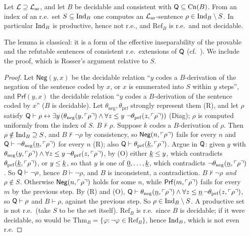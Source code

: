 \begin{lemma}\label{lem:soi:productive}
Let $\mathcal L\supseteq\mathcal{L}_{\mathrm{ar}}$, and let $B$ be decidable and consistent with $\mathsf{Q}\subseteq\mathrm{Cn}(B)$. From an index of an r.e.\ set $S\subseteq\mathrm{Ind}_{B}$ one computes an $\mathcal{L}_{\mathrm{ar}}$-sentence $\rho\in\mathrm{Ind}_{B}\setminus S$. In particular $\mathrm{Ind}_{B}$ is productive, hence not r.e., and $\mathrm{Ref}_B$ is r.e.\ and not decidable.
\end{lemma}

The lemma is classical: it is a form of the effective inseparability of the provable and the refutable sentences of consistent r.e.\ extensions of $\mathsf{Q}$ (cf.\ \citealp{smullyan1961theory}). We include the proof, which is Rosser's argument relative to $S$.

\begin{proof}
Let $\mathsf{Neg}(y,x)$ be the decidable relation ``$y$ codes a $B$-derivation of the negation of the sentence coded by $x$, or $x$ is enumerated into $S$ within $y$ steps'', and $\mathsf{Prf}(y,x)$ the decidable relation ``$y$ codes a $B$-derivation of the sentence coded by $x$'' ($B$ is decidable). Let $\theta_{\mathrm{neg}},\theta_{\mathrm{prf}}$ strongly represent them (R), and let $\rho$ satisfy $\Q\vdash\rho\leftrightarrow\exists y\,(\theta_{\mathrm{neg}}(y,\gn\rho)\wedge\forall z\le y\ \neg\theta_{\mathrm{prf}}(z,\gn\rho))$ (Diag); $\rho$ is computed uniformly from the index of $S$.
\emph{$B\nvdash\rho$.} Suppose $k$ codes a $B$-derivation of $\rho$. Then $\rho\notin\mathrm{Ind}_{B}\supseteq S$, and $B\nvdash\neg\rho$ by consistency, so $\mathsf{Neg}(n,\ulcorner \rho\urcorner)$ fails for every $n$ and $\mathsf{Q}\vdash\neg\theta_{\mathrm{neg}}(\underline{n},\ulcorner \rho\urcorner)$ for every $n$ (R); also $\mathsf{Q}\vdash\theta_{\mathrm{prf}}(\underline{k},\ulcorner \rho\urcorner)$. Argue in $\mathsf{Q}$: given $y$ with $\theta_{\mathrm{neg}}(y,\ulcorner \rho\urcorner)\wedge\forall z\le y\,\neg\theta_{\mathrm{prf}}(z,\ulcorner \rho\urcorner)$, by (O) either $\underline{k}\le y$, which contradicts $\theta_{\mathrm{prf}}(\underline{k},\ulcorner \rho\urcorner)$, or $y\le\underline{k}$, so that $y$ is one of $\underline{0},\dots,\underline{k}$, which contradicts $\neg\theta_{\mathrm{neg}}(\underline{n},\ulcorner \rho\urcorner)$. So $\mathsf{Q}\vdash\neg\rho$, hence $B\vdash\neg\rho$, and $B$ is inconsistent, a contradiction.
\emph{$B\nvdash\neg\rho$ and $\rho\notin S$.} Otherwise $\mathsf{Neg}(n,\ulcorner \rho\urcorner)$ holds for some $n$, while $\mathsf{Prf}(m,\ulcorner \rho\urcorner)$ fails for every $m$ by the previous step. By (R) and (O), $\mathsf{Q}\vdash\theta_{\mathrm{neg}}(\underline{n},\ulcorner \rho\urcorner)\wedge\forall z\le\underline{n}\,\neg\theta_{\mathrm{prf}}(z,\ulcorner \rho\urcorner)$, so $\mathsf{Q}\vdash\rho$ and $B\vdash\rho$, against the previous step.
So $\rho\in\mathrm{Ind}_{B}\setminus S$. A productive set is not r.e.\ (take $S$ to be the set itself). $\mathrm{Ref}_B$ is r.e.\ since $B$ is decidable; if it were decidable, so would be $\mathrm{Thm}_B=\{\varphi:\neg\varphi\in\mathrm{Ref}_B\}$, hence $\mathrm{Ind}_{B}$, which is not even r.e.
\end{proof}


